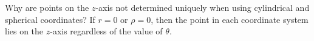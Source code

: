 {Why are points on the $z$-axis not determined uniquely when using cylindrical and spherical coordinates?
}
{If $r=0$ or $\rho=0$, then the point in each coordinate system lies on the $z$-axis regardless of the value of $\theta$.
}
